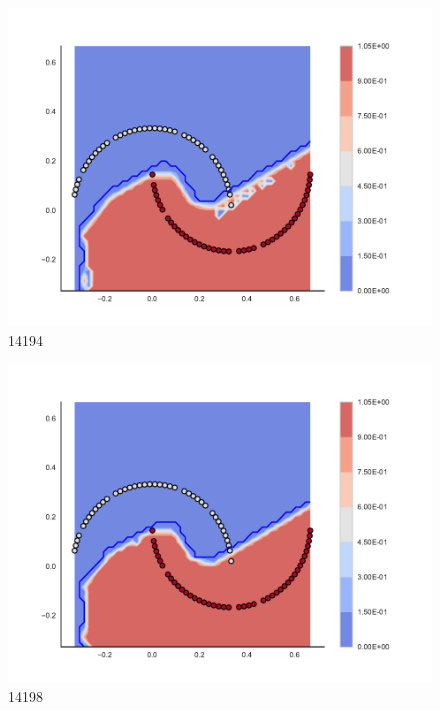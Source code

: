 \begin{subfigure}[b]{0.09\textwidth}
    \includegraphics[clip, trim=2.35cm 1.75cm 4.5cm 0cm,width=\textwidth]{img/convergence/14194.pdf}
    \caption{14194}
    \label{fig:convergence_14194}
\end{subfigure}
%
\begin{subfigure}[b]{0.09\textwidth}
    \includegraphics[clip, trim=2.35cm 1.75cm 4.5cm 0cm,width=\textwidth]{img/convergence/14198.pdf}
    \caption{14198}
    \label{fig:convergence_14198}
\end{subfigure}
%
